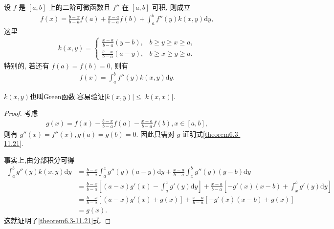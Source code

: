 \documentclass[../../main.tex]{subfiles}
\begin{document}
\begin{theorem}[带积分型余项的Lagrange插值公式]\label{theorem:带积分型余项的Lagrange插值公式}
设 $f$ 是 $[a,b]$ 上的二阶可微函数且 $f''$ 在 $[a,b]$ 可积, 则成立
\begin{align*}
f(x) = \frac{b-x}{b-a} f(a) + \frac{x-a}{b-a} f(b) + \int_{a}^{b} f''(y) k(x,y) \mathrm{d}y,
\end{align*}
这里
\begin{align*}
k(x,y) = 
\begin{cases}
\frac{x-a}{b-a} (y-b), & b \geqslant  y \geqslant  x \geqslant  a, \\
\frac{b-x}{b-a} (a-y), & b \geqslant  x \geqslant  y \geqslant  a.
\end{cases}
\end{align*}
特别的, 若还有 $f(a) = f(b) = 0$, 则有
\begin{align}
f(x) = \int_{a}^{b} f''(y) k(x,y) \mathrm{d}y.\label{theorem6.3-11.21}
\end{align}
\end{theorem}
\begin{note}
$k(x,y)$也叫Green函数.容易验证$|k(x,y)|\leqslant  |k(x,x)|$.
\end{note}
\begin{proof}
考虑
\begin{align*}
g(x) = f(x) - \frac{b-x}{b-a} f(a) - \frac{x-a}{b-a} f(b), x \in [a,b],
\end{align*}
则有 $g''(x) = f''(x), g(a) = g(b) = 0$. 因此只需对 $g$ 证明式\eqref{theorem6.3-11.21}.

事实上,由分部积分可得
\begin{align*}
\int_{a}^{b} g''(y) k(x,y) \mathrm{d}y &= \frac{b-x}{b-a} \int_{a}^{x} g''(y) (a-y) \mathrm{d}y + \frac{x-a}{b-a} \int_{x}^{b} g''(y) (y-b) \mathrm{d}y \\
&= \frac{b-x}{b-a} \left[ (a-x) g'(x) - \int_{a}^{x} g'(y) \mathrm{d}y \right] + \frac{x-a}{b-a} \left[ -g'(x) (x-b) + \int_{x}^{b} g'(y) \mathrm{d}y \right] \\
&= \frac{b-x}{b-a} [(a-x) g'(x) + g(x)] + \frac{x-a}{b-a} [-g'(x) (x-b) + g(x)] \\
&= g(x).
\end{align*}
这就证明了\eqref{theorem6.3-11.21}式.
\end{proof}
\end{document}
